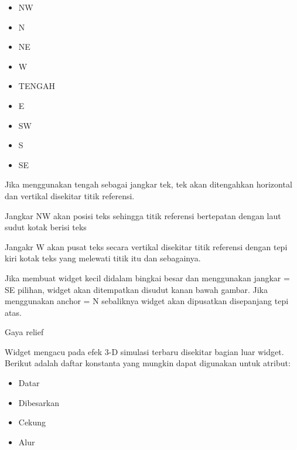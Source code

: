\documentclass[a4paper,12pt]{report}
\begin{document}
\begin{myEnumerate}
\begin{itemize}
\noindent 
\item NW \par
\noindent 
\item N \par
\noindent 
\item NE \par
\noindent 
\item W \par
\noindent 
\item TENGAH \par
\noindent 
\item E \par
\noindent 
\item SW \par
\noindent 
\item S \par
\noindent 
\item SE\end{itemize}
 \par
\vspace{12pt}
Jika menggunakan tengah sebagai jangkar tek, tek akan ditengahkan horizontal dan vertikal disekitar titik referensi. \par
Jangkar NW akan posisi teks sehingga titik referensi bertepatan dengan laut sudut kotak berisi teks \par
Jangakr W akan pusat teks secara vertikal disekitar titik referensi dengan tepi kiri kotak teks yang melewati titik itu dan sebagainya. \par
Jika membuat widget kecil didalam bingkai besar dan menggunakan jangkar = SE pilihan, widget akan ditempatkan disudut kanan bawah gambar. Jika menggunakan anchor = N sebaliknya widget akan dipusatkan disepanjang tepi atas. \par
\noindent 
\item Gaya relief \par
\noindent 
Widget mengacu pada efek 3-D simulasi terbaru disekitar bagian luar widget. Berikut adalah daftar konstanta yang mungkin dapat digunakan untuk atribut: \par
\noindent 
\begin{itemize}
\item Datar \par
\noindent 
\item Dibesarkan \par
\noindent 
\item Cekung \par
\noindent 
\item Alur \par

\end{itemize}
\end{myEnumerate}
\end{document}

